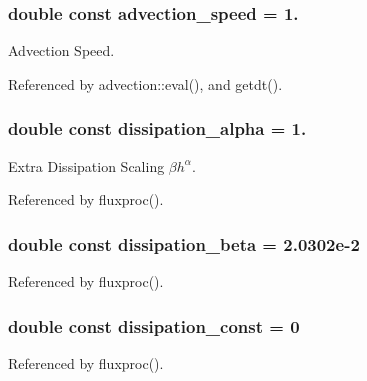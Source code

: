 \subsubsection[{advection\-\_\-speed}]{\setlength{\rightskip}{0pt plus 5cm}double const advection\-\_\-speed = 1.}\label{physpara_8cpp_a0e52074011cf7b3d4fa8c85dd2461da7}


Advection Speed. 



Referenced by advection\-::eval(), and getdt().

\subsubsection[{dissipation\-\_\-alpha}]{\setlength{\rightskip}{0pt plus 5cm}double const dissipation\-\_\-alpha = 1.}\label{physpara_8cpp_a8d455aa4610efb513713db3bbf886208}


Extra Dissipation Scaling $ \beta h^\alpha $. 



Referenced by fluxproc().

\subsubsection[{dissipation\-\_\-beta}]{\setlength{\rightskip}{0pt plus 5cm}double const dissipation\-\_\-beta = 2.\-0302e-\/2}\label{physpara_8cpp_a752e3f9cf5ef0011b3db5475a9f7f8bf}


Referenced by fluxproc().

\subsubsection[{dissipation\-\_\-const}]{\setlength{\rightskip}{0pt plus 5cm}double const dissipation\-\_\-const = 0}\label{physpara_8cpp_ac317ad6e157f299d3108388f32c9133e}


Referenced by fluxproc().

